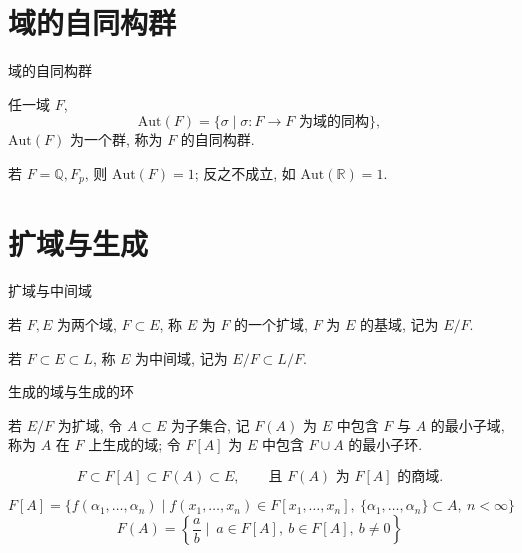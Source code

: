 
\section[自同构]{域的自同构群}


\begin{frame}{域的自同构群}

任一域 $F$,
\[
\mathrm{Aut}(F) = \{ \sigma \mid \sigma: F \to F \text{ 为域的同构} \},
\]
$\mathrm{Aut}(F)$ 为一个群, 称为 $F$ 的自同构群.

\pause

若 $F = \mathbb{Q}, F_p$, 则 $\mathrm{Aut}(F) = 1$;
反之不成立, 如 $\mathrm{Aut}(\mathbb{R}) = 1$.

\end{frame}


\section[生成]{扩域与生成}


\begin{frame}{扩域与中间域}

若 $F, E$ 为两个域, $F \subset E$, 称 $E$ 为 $F$ 的一个扩域, $F$ 为 $E$ 的基域,
记为 $E/F$.

\pause

若 $F \subset E \subset L$, 称 $E$ 为中间域, 记为 $E/F \subset L/F$.

\end{frame}


\begin{frame}{生成的域与生成的环}

若 $E/F$ 为扩域, 令 $A \subset E$ 为子集合,
记 $F(A)$ 为 $E$ 中包含 $F$ 与 $A$ 的最小子域, 称为 $A$ 在 $F$ 上生成的域;
令 $F[A]$ 为 $E$ 中包含 $F \cup A$ 的最小子环.

\[
F \subset F[A] \subset F(A) \subset E, \qquad
\text{且 } F(A) \text{ 为 } F[A] \text{ 的商域.}
\]

\pause

\[
F[A] = \{ f(\alpha_1, \dots, \alpha_n) \mid
f(x_1, \dots, x_n) \in F[x_1, \dots, x_n],\ \{\alpha_1, \dots, \alpha_n\} \subset A,\ n < \infty \}
\]
\[
F(A) = \left\{ \frac{a}{b} \mid\ a \in F[A],\ b \in F[A],\ b \neq 0 \right\}
\]

\end{frame}

